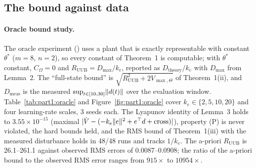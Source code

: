 \subsection{The bound against data}

\paragraph{Oracle bound study.} The oracle experiment () uses a plant that is
exactly representable with constant $\theta^*$ ($m=8$, $n=2$), so every constant of Theorem~1 is computable; with $\theta^*$ constant,
$C_\Omega=0$ and $R_{\mathrm{UUB}}=D_{\max}/k_e$, reported as $D_{\mathrm{theory}}/k_e$ with $D_{\max}$ from Lemma~2.
The ``full-state bound'' is $\sqrt{R_{\mathrm{UUB}}^2+2V_{\max,\Theta}}$ of Theorem~1(ii), and $D_{\mathrm{meas}}$ is
the measured $\sup_{t\in[10,30]}\lVert d(t)\rVert$ over the evaluation window. Table~\ref{tab:part1:oracle} and
Figure~\ref{fig:part1:oracle} cover $k_e\in\{2,5,10,20\}$ and four learning-rate scales, 3 seeds each. The Lyapunov
identity of Lemma~3 holds to $3.55\times10^{-15}$ (maximal $\lvert \dot V-(-k_e\lVert e\rVert^2+e^\top d+\mathrm{cross})\rvert$),
property (P) is never violated, the hard bounds held, and the RMS bound of Theorem~1(iii) with the measured
disturbance holds in 48/48 runs and tracks $1/k_e$. The a-priori $R_{\mathrm{UUB}}$ is 26.1--261.1 against observed
RMS errors of 0.0087--0.0908; the ratio of the a-priori bound to the observed RMS error ranges from $915\times$ to
$10954\times$.

